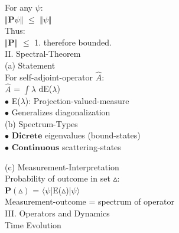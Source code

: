 \documentclass[10pt,fancy]{elegantbook}
\begin{document}
{For any $\psi$: \\  
    
    $\Vert \mathbf P \psi \Vert$ $\leq$ $\Vert \psi \Vert$ \\ 
    
    Thus: \\
 
        $\Vert \mathbf P \Vert$ $\leq$ 1. therefore bounded. \\

II. Spectral-Theorem \\
 
(a) Statement \\ 

For self-adjoint-operator $\hat A$:  \\
  
    $\hat A$ = $\int \lambda$ dE($\lambda$)  \\
  
$\bullet$ E($\lambda$): Projection-valued-measure  \\
  
$\bullet$ Generalizes diagonalization \\

(b) Spectrum-Types \\
 
$\bullet$ $\mathbf {Dicrete}$ eigenvalues (bound-states) \\
 
$\bullet$ $\mathbf {Continuous}$ scattering-states  

(c) Measurement-Interpretation \\ 

Probability of outcome in set $\vartriangle$: \\
 
    $\mathbf {P}(\vartriangle)$ = $\langle \psi$|E($\vartriangle$)|$\psi \rangle$  \\

    Measurement-outcome = spectrum of operator  \\

III. Operators and Dynamics  \\  

Time Evolution  \\  

}
\end{document}
